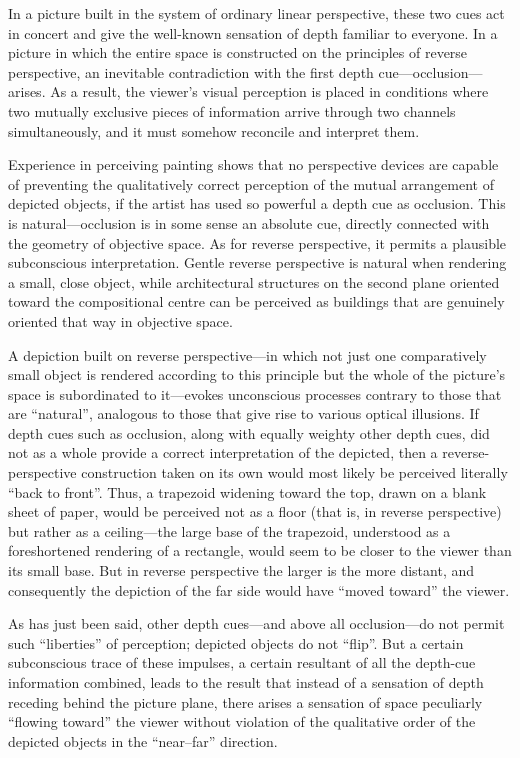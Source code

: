 In a picture built in the system of ordinary linear perspective, these two cues act
in concert and give the well-known sensation of depth familiar to everyone. In a
picture in which the entire space is constructed on the principles of reverse
perspective, an inevitable contradiction with the first depth cue---occlusion---
arises. As a result, the viewer's visual perception is placed in conditions where
two mutually exclusive pieces of information arrive through two channels
simultaneously, and it must somehow reconcile and interpret them.


Experience in perceiving painting shows that no perspective devices are capable of
preventing the qualitatively correct perception of the mutual arrangement of
depicted objects, if the artist has used so powerful a depth cue as occlusion.
This is natural---occlusion is in some sense an absolute cue, directly connected
with the geometry of objective space. As for reverse perspective, it permits a
plausible subconscious interpretation. Gentle reverse perspective is natural when
rendering a small, close object, while architectural structures on the second plane
oriented toward the compositional centre can be perceived as buildings that are
genuinely oriented that way in objective space.

A depiction built on reverse perspective---in which not just one comparatively small
object is rendered according to this principle but the whole of the picture's space
is subordinated to it---evokes unconscious processes contrary to those that are
``natural'', analogous to those that give rise to various optical illusions. If
depth cues such as occlusion, along with equally weighty other depth cues, did not
as a whole provide a correct interpretation of the depicted, then a
reverse-perspective construction taken on its own would most likely be perceived
literally ``back to front''. Thus, a trapezoid widening toward the top, drawn on a
blank sheet of paper, would be perceived not as a floor (that is, in reverse
perspective) but rather as a ceiling---the large base of the trapezoid, understood
as a foreshortened rendering of a rectangle, would seem to be closer to the viewer
than its small base. But in reverse perspective the larger is the more distant, and
consequently the depiction of the far side would have ``moved toward'' the viewer.

As has just been said, other depth cues---and above all occlusion---do not permit
such ``liberties'' of perception; depicted objects do not ``flip''. But a certain
subconscious trace of these impulses, a certain resultant of all the depth-cue
information combined, leads to the result that instead of a sensation of depth
receding behind the picture plane, there arises a sensation of space peculiarly
``flowing toward'' the viewer without violation of the qualitative order of the
depicted objects in the ``near--far'' direction.

